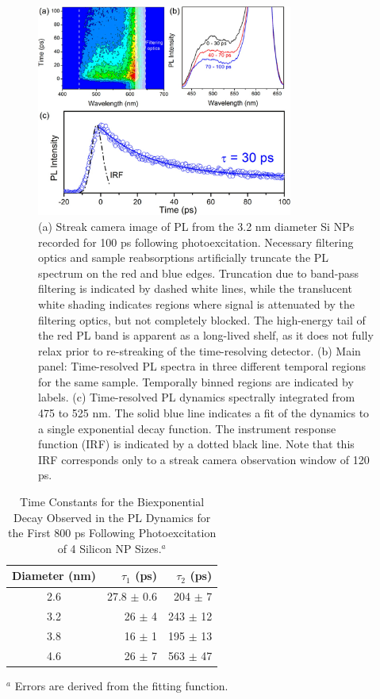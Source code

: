 \begin{figure}
\begin{center}
\includegraphics[width=0.75\textwidth]{./Chapter6/amsi2.jpeg}
\caption[Picosecond-scale evolution of PL from crystalline Si nanoparticles.]{(a) Streak camera image of PL from the 3.2 nm diameter Si NPs recorded for 100 ps following photoexcitation. Necessary filtering optics and sample reabsorptions artificially truncate the PL spectrum on the red and blue edges. Truncation due to band-pass filtering is indicated by dashed white lines, while the translucent white shading indicates regions where signal is attenuated by the filtering optics, but not completely blocked. The high-energy tail of the red PL band is apparent as a long-lived shelf, as it does not fully relax prior to re-streaking of the time-resolving detector. (b) Main panel: Time-resolved PL spectra in three different temporal regions for the same sample. Temporally binned regions are indicated by labels. (c) Time-resolved PL dynamics spectrally integrated from 475 to 525 nm. The solid blue line indicates a fit of the dynamics to a single exponential decay function. The instrument response function (IRF) is indicated by a dotted black line. Note that this IRF corresponds only to a streak camera observation window of 120 ps.}
\label{f:amsi2}
\end{center}
\end{figure}

\begin{table}
\caption{Time Constants for the Biexponential Decay Observed in the PL Dynamics for the First 800 ps Following Photoexcitation of 4 Silicon NP Sizes.$^a$}
\centering
\begin{tabular}{c r r }
\hline\hline
Diameter (nm) & $\tau_1$ (ps) & $\tau_2$ (ps) \\
\hline
2.6 & 27.8 $\pm$ 0.6 & 204 $\pm$ 7 \\
3.2 & 26 $\pm$ 4 & 243 $\pm$ 12 \\
3.8 & 16 $\pm$ 1 & 195 $\pm$ 13 \\
4.6 & 26 $\pm$ 7 & 563 $\pm$ 47 \\
\hline
\end{tabular} \par
\bigskip
$^a$ Errors are derived from the fitting function.
\label{table:amsiT1}
\end{table}

